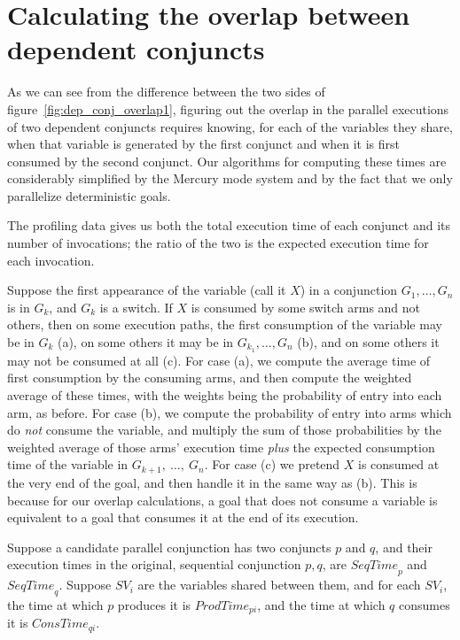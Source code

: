 \section{Calculating the overlap between dependent conjuncts}
\label{sec:overlap}

As we can see from the difference between the two sides of
figure~\ref{fig:dep_conj_overlap1},
figuring out the overlap
in the parallel executions of two dependent conjuncts
requires knowing, for each of the variables they share,
when that variable is generated by the first conjunct and
when it is first consumed by the second conjunct.
Our algorithms for computing these times are considerably simplified
by the Mercury mode system
and by the fact that we only parallelize deterministic goals.

The profiling data gives us both
the total execution time of each conjunct
and its number of invocations;
the ratio of the two is the expected execution time for each invocation.


Suppose the first appearance of the variable (call it $X$)
in a conjunction $G_1, \ldots, G_n$ is in $G_k$, and $G_k$ is a switch.
If $X$ is consumed by some switch arms and not others,
then on some execution paths,
the first consumption of the variable may be in $G_k$ (a),
on some others it may be in $G_{k_1}, \ldots, G_n$ (b),
and on some others it may not be consumed at all (c).
For case (a),
we compute the average time of first consumption by the consuming arms,
and then compute the weighted average of these times,
with the weights being the probability of entry into each arm, as before.
For case (b), we compute the probability of entry
into arms which do \emph{not} consume the variable,
and multiply the sum of those probabilities
by the weighted average of those arms' execution time
\emph{plus} the expected consumption time of the variable
in $G_{k+1},~\ldots,~G_n$.
For case (c)
we pretend $X$ is consumed at the very end of the goal,
and then handle it in the same way as (b).
This is because for our overlap calculations,
a goal that does not consume a variable is equivalent to
a goal that consumes it at the end of its execution.


Suppose a candidate parallel conjunction has two conjuncts $p$ and $q$,
and their execution times in the original, sequential conjunction $p, q$,
are ${SeqTime}_p$ and ${SeqTime}_q$.
Suppose ${SV}_i$ are the variables shared between them,
and for each ${SV}_i$,
the time at which $p$ produces it is ${ProdTime}_{pi}$, and
the time at which $q$ consumes it is ${ConsTime}_{qi}$.

